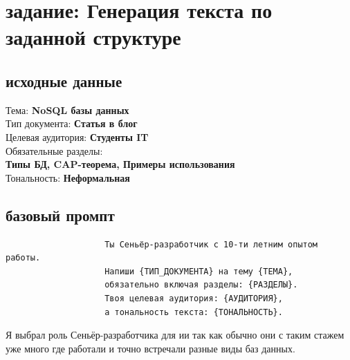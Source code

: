 \section{задание: Генерация текста по заданной структуре}
\subsection{исходные данные}
\indent Тема: \textbf{NoSQL базы данных} \\
\indent Тип документа: \textbf{Статья в блог} \\
\indent Целевая аудитория: \textbf{Студенты IT} \\
\indent Обязательные разделы: \textbf{ \\ \indent \indent Типы БД, CAP-теорема, Примеры использования} \\
\indent Тональность: \textbf{Неформальная}
\subsection{базовый промпт}
\begin{verbatim}
					Ты Сеньёр-разработчик с 10-ти летним опытом работы.
					Напиши {ТИП_ДОКУМЕНТА} на тему {ТЕМА},
					обязательно включая разделы: {РАЗДЕЛЫ}.
					Твоя целевая аудитория: {АУДИТОРИЯ},
					а тональность текста: {ТОНАЛЬНОСТЬ}.
\end{verbatim}
Я выбрал роль Сеньёр-разработчика для ии так как обычно они с таким стажем уже много где работали и точно встречали разные виды баз данных.
